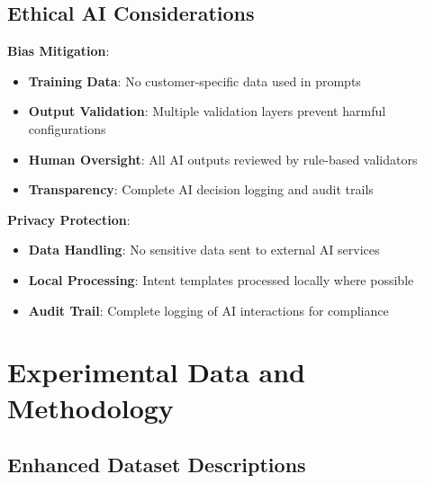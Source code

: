 \documentclass[conference]{IEEEtran}
\begin{document}
\subsection{Ethical AI Considerations}

\textbf{Bias Mitigation}:
\begin{itemize}
\item \textbf{Training Data}: No customer-specific data used in prompts
\item \textbf{Output Validation}: Multiple validation layers prevent harmful configurations
\item \textbf{Human Oversight}: All AI outputs reviewed by rule-based validators
\item \textbf{Transparency}: Complete AI decision logging and audit trails
\end{itemize}

\textbf{Privacy Protection}:
\begin{itemize}
\item \textbf{Data Handling}: No sensitive data sent to external AI services
\item \textbf{Local Processing}: Intent templates processed locally where possible
\item \textbf{Audit Trail}: Complete logging of AI interactions for compliance
\end{itemize}

\section{Experimental Data and Methodology}

\subsection{Enhanced Dataset Descriptions}
\end{document}
